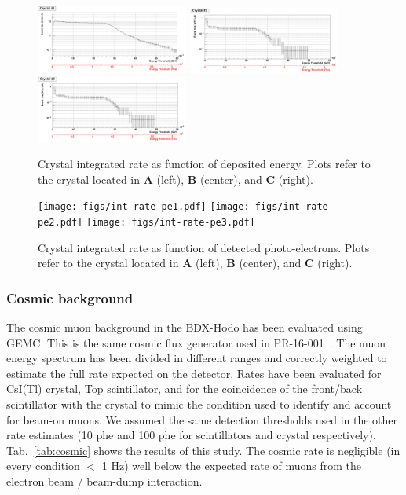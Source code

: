 \begin{figure}[h!] 
\center
\includegraphics[width=5.0cm]{figs/int-rate-E1.pdf}
\includegraphics[width=5.0cm]{figs/int-rate-E2.pdf}
\includegraphics[width=5.0cm]{figs/int-rate-E3.pdf}
\caption {Crystal integrated rate as function of deposited energy.
Plots refer to the crystal located in {\bf A} (left),  {\bf B} (center), and {\bf C} (right).}
\label{fig:int-rates-E}
\end{figure}
\begin{figure}[h!] 
\center
\texttt{[image: figs/int-rate-pe1.pdf]}
\texttt{[image: figs/int-rate-pe2.pdf]}
\texttt{[image: figs/int-rate-pe3.pdf]}
\caption {Crystal integrated rate as function of detected photo-electrons.
Plots refer to the crystal located in {\bf A} (left),  {\bf B} (center), and {\bf C} (right).}
\label{fig:int-rates-pe}
\end{figure}

\subsubsection{Cosmic background}
The cosmic muon background in the BDX-Hodo has been evaluated using GEMC. This is the same cosmic flux generator used in PR-16-001~\cite{bdx-proposal}. The muon energy spectrum has been divided in different ranges  and correctly weighted to estimate the full rate expected on the detector. Rates have been evaluated for CsI(Tl) crystal, Top scintillator,  and for the coincidence of the front/back scintillator with the crystal  to mimic the condition used to identify and account for beam-on muons. We assumed the same detection thresholds used in the other rate estimates (10 phe and 100 phe for scintillators and crystal respectively). Tab.~\ref{tab:cosmic} shows the results of this study. The cosmic rate is negligible (in every condition $<$ 1 Hz) well below the expected rate of muons from the electron beam / beam-dump interaction.

